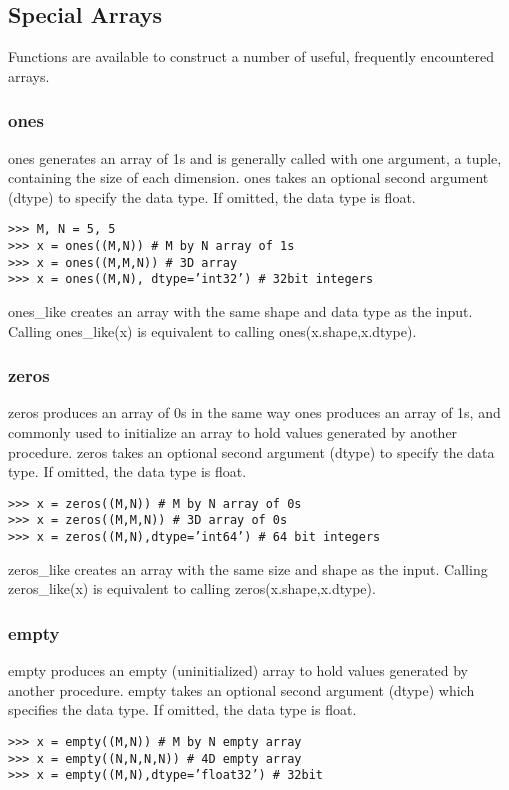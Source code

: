 \documentclass[KSmain.tex]{subfiles}
\begin{document}
 

\subsection{Special Arrays}
Functions are available to construct a number of useful, frequently encountered arrays.

\subsubsection{ones}
ones generates an array of 1s and is generally called with one argument, a tuple, containing the size of
each dimension. ones takes an optional second argument (dtype) to specify the data type. If omitted, the
data type is float.
\begin{framed}
\begin{verbatim}
>>> M, N = 5, 5
>>> x = ones((M,N)) # M by N array of 1s
>>> x = ones((M,M,N)) # 3D array
>>> x = ones((M,N), dtype=’int32’) # 32bit integers
\end{verbatim}
\end{framed}
ones\_like creates an array with the same shape and data type as the input. Calling ones\_like(x) is equivalent
to calling ones(x.shape,x.dtype).

\subsubsection{zeros}
zeros produces an array of 0s in the same way ones produces an array of 1s, and commonly used to initialize
an array to hold values generated by another procedure. zeros takes an optional second argument
(dtype) to specify the data type. If omitted, the data type is float.
\begin{framed}
\begin{verbatim}
>>> x = zeros((M,N)) # M by N array of 0s
>>> x = zeros((M,M,N)) # 3D array of 0s
>>> x = zeros((M,N),dtype=’int64’) # 64 bit integers
\end{verbatim}
\end{framed}
zeros\_like creates an array with the same size and shape as the input. Calling zeros\_like(x) is equivalent
to calling zeros(x.shape,x.dtype).

\subsubsection{empty}
empty produces an empty (uninitialized) array to hold values generated by another procedure. empty takes
an optional second argument (dtype) which specifies the data type. If omitted, the data type is float.
\begin{framed}
\begin{verbatim}
>>> x = empty((M,N)) # M by N empty array
>>> x = empty((N,N,N,N)) # 4D empty array
>>> x = empty((M,N),dtype=’float32’) # 32bit
\end{verbatim}
\end{framed}
\end{document}
